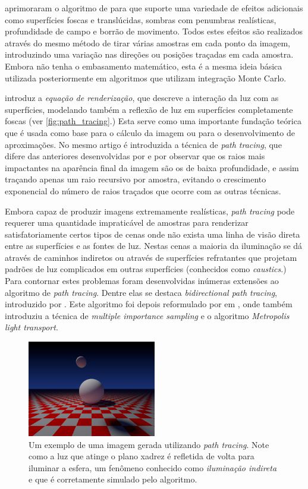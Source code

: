 \documentclass[tg]{mdtufsm}
\begin{document}
 aprimoraram o algoritmo de \citeauthor{whitted1980} para que suporte uma variedade
de efeitos adicionais como superfícies foscas e translúcidas, sombras com penumbras realísticas,
profundidade de campo e borrão de movimento. Todos estes efeitos são realizados através do mesmo
método de tirar várias amostras em cada ponto da imagem, introduzindo uma variação nas direções ou
posições traçadas em cada amostra. Embora não tenha o embasamento matemático, esta é a mesma ideia
básica utilizada posteriormente em algoritmos que utilizam integração Monte Carlo.

 introduz a \emph{equação de renderização}, que descreve a interação da luz com as
superfícies, modelando também a reflexão de luz em superfícies completamente foscas (ver
\autoref{fig:path_tracing}.) Esta serve como uma importante fundação teórica que é usada como base
para o cálculo da imagem ou para o desenvolvimento de aproximações. No mesmo artigo é introduzida a
técnica de \emph{path tracing}, que difere das anteriores desenvolvidas por \citeauthor{cook1984} e
\citeauthor{whitted1980} por observar que os raios mais impactantes na aparência final da imagem são
os de baixa profundidade, e assim traçando apenas um raio recursivo por amostra, evitando o
crescimento exponencial do número de raios traçados que ocorre com as outras técnicas.

Embora capaz de produzir imagens extremamente realísticas, \emph{path tracing} pode requerer uma
quantidade impraticável de amostras para renderizar satisfatoriamente certos tipos de cenas onde não
exista uma linha de visão direta entre as superfícies e as fontes de luz. Nestas cenas a maioria da
iluminação se dá através de caminhos indiretos ou através de superfícies refratantes que projetam
padrões de luz complicados em outras superfícies (conhecidos como \emph{caustics}.) Para contornar
estes problemas foram desenvolvidas inúmeras extensões ao algoritmo de \emph{path tracing}. Dentre
elas se destaca \emph{bidirectional path tracing}, introduzido por \citet{lafortune1993}. Este
algoritmo foi depois reformulado por \citeauthor{veach1997} em \citep{veach1997}, onde também
introduziu a técnica de \emph{multiple importance sampling} e o algoritmo \emph{Metropolis light
transport}.

\begin{figure}
	\centering
	\includegraphics[width=0.5\textwidth]{exemplo_imagem}
	\caption{
		Um exemplo de uma imagem gerada utilizando \emph{path tracing}. Note como a luz que atinge o
		plano xadrez é refletida de volta para iluminar a esfera, um fenômeno conhecido como
		\emph{iluminação indireta} e que é corretamente simulado pelo algoritmo.
	}
	\label{fig:path_tracing}
\end{figure}
\end{document}
